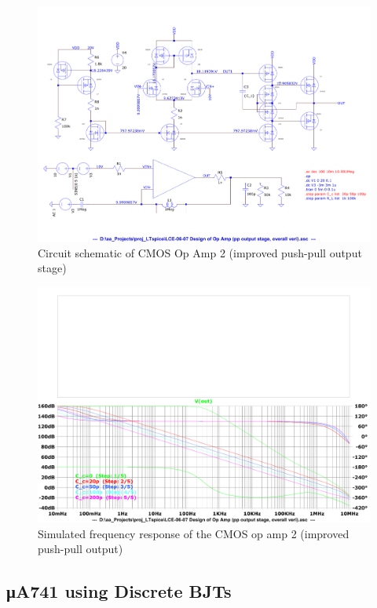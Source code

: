 \documentclass[UTF8]{article}
\begin{document}
\begin{figure}[H]\centering
    \includegraphics[width=0.91\columnwidth]{assets/op amp 2/CMOS op amp 2 (PP).pdf}
    \caption{Circuit schematic of CMOS Op Amp 2 (improved push-pull output stage)}
    \label{fig: CMOS Op Amp 2}
\end{figure}

\begin{figure}[H]\centering
    \includegraphics[width=0.91\columnwidth]{assets/op amp 2/gain of CMOS op amp 2 copy.pdf}
    \caption{Simulated frequency response of the CMOS op amp 2 (improved push-pull output)}
    \label{gain of CMOS op amp 2}
\end{figure}

\subsection{μA741 using Discrete BJTs}
\vspace*{-2mm}
\end{document}
